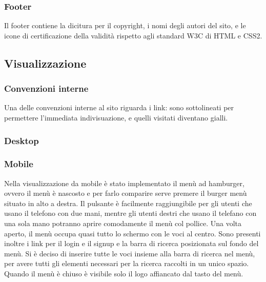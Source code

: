 \subsubsection{Footer}
\label{ssub:footer}
Il footer contiene la dicitura per il copyright, i nomi degli autori del sito, e le icone di certificazione della validità rispetto agli standard W3C di HTML e CSS2.

\subsection{Visualizzazione} %
\label{sub:visualizzazione}
\subsubsection{Convenzioni interne}
\label{ssub:convenzioni_interne}
Una delle convenzioni interne al sito riguarda i link: sono sottolineati per permettere l'immediata indivisuazione, e quelli visitati diventano gialli.
\subsubsection{Desktop}
\label{ssub:desktop}

\subsubsection{Mobile}
\label{ssub:mobile}
Nella visualizzazione da mobile è stato implementato il menù ad hamburger, ovvero il menù è nascosto e per farlo comparire serve premere il burger menù situato in alto a destra. Il pulsante è facilmente raggiungibile per gli utenti che usano il telefono con due mani, mentre gli utenti destri che usano il telefano con una sola mano potranno aprire comodamente il menù col pollice.
Una volta aperto, il menù occupa quasi tutto lo schermo con le voci al centro. Sono presenti inoltre i link per il login e il signup e la barra di ricerca posizionata sul fondo del menù. Si è deciso di inserire tutte le voci insieme alla barra di ricerca nel menù, per avere tutti gli elementi necessari per la ricerca raccolti in un unico spazio. Quando il menù è chiuso è visibile solo il logo affiancato dal tasto del menù.


